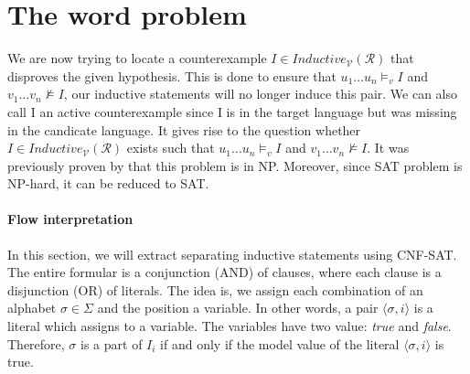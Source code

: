 \section{The word problem}
We are now trying to locate a counterexample $I \in Inductive_{\mathcal{V}}(\mathcal{R})$ that disproves the given hypothesis. 
This is done to ensure that $u_1 \dots u_n \models_v I$
and $v_1 \dots v_n \not\models I$, our inductive statements will no longer induce this pair.
We can also call I an active counterexample since I is in the target language but was missing in 
the candicate language. 
It gives rise to the question whether $I \in Inductive_{\mathcal{V}}(\mathcal{R})$ exists such that $u_1 \dots u_n \models_v I$
and $v_1 \dots v_n \not\models I$.
It was previously proven by \cite{Welzel2023InductiveSts} that this problem is in NP.
Moreover, since SAT problem is NP-hard, it can be reduced to SAT.

\paragraph*{Flow interpretation}
In this section, we will extract separating inductive statements using CNF-SAT. 
The entire formular is a conjunction (AND) of clauses, where each clause is a disjunction (OR) of literals.
The idea is, we assign each combination of an alphabet $\sigma \in \Sigma$ and the position 
a variable. 
In other words, a pair $\langle \sigma, i \rangle$ is a literal which assigns to a variable.
The variables have two value: \textit{true} and \textit{false}.
Therefore, $\sigma$ is a part of $I_i$ if and only if the  model value of the literal $\langle \sigma, i \rangle$ is true.

